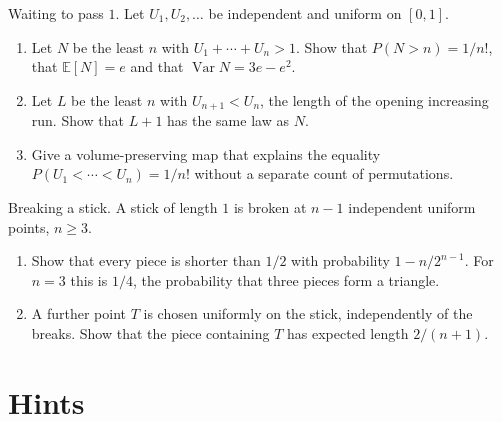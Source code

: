 \begin{exercise}[$\star\star$]\label{pb:passone}
Waiting to pass $1$. Let $U_1,U_2,\ldots$ be independent and uniform on $[0,1]$.
\begin{enumerate}[label=(\alph*)]
\item Let $N$ be the least $n$ with $U_1+\cdots+U_n>1$. Show that $P(N>n)=1/n!$, that $\mathbb E[N]=e$ and that $\operatorname{Var} N=3e-e^2$.
\item Let $L$ be the least $n$ with $U_{n+1}<U_n$, the length of the opening increasing run. Show that $L+1$ has the same law as $N$.
\item Give a volume-preserving map that explains the equality $P(U_1<\cdots<U_n)=1/n!$ without a separate count of permutations.
\end{enumerate}
\end{exercise}

\begin{exercise}[$\star\star$]\label{pb:stick}
Breaking a stick. A stick of length $1$ is broken at $n-1$ independent uniform points, $n\ge3$.
\begin{enumerate}[label=(\alph*)]
\item Show that every piece is shorter than $1/2$ with probability $1-n/2^{n-1}$. For $n=3$ this is $1/4$, the probability that three pieces form a triangle.
\item A further point $T$ is chosen uniformly on the stick, independently of the breaks. Show that the piece containing $T$ has expected length $2/(n+1)$.
\end{enumerate}
\end{exercise}

\section{Hints}

